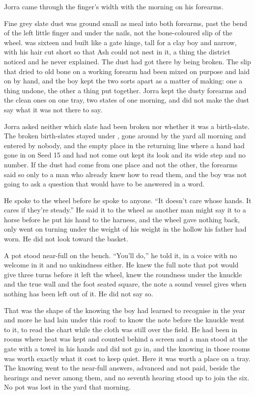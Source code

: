 Jorra came through the finger's width with the morning on his forearms.

Fine grey slate dust was ground small as meal into both forearms, past the bend of the left little finger and under the nails, not the bone-coloured slip of the wheel.  was sixteen and built like a gate hinge, tall for a clay boy and narrow, with his hair cut short so that Ash could not nest in it, a thing the district noticed and he never explained. The dust had got there by being broken. The slip that dried to old bone on a working forearm had been mixed on purpose and laid on by hand, and the boy kept the two sorts apart as a matter of making: one a thing undone, the other a thing put together. Jorra kept the dusty forearms and the clean ones on one tray, two states of one morning, and did not make the dust say what it was not there to say.

Jorra asked neither which slate had been broken nor whether it was a birth-slate. The broken birth-slates stayed under , gone around by the yard all morning and entered by nobody, and the empty place in the returning line where a hand had gone in on Seed 15 and had not come out kept its look and its wide step and no number. If the dust had come from one place and not the other, the forearms said so only to a man who already knew how to read them, and the boy was not going to ask a question that would have to be answered in a word.

He spoke to the wheel before he spoke to anyone. “It doesn’t care whose hands. It cares if they’re steady.” He said it to the wheel as another man might say it to a horse before he put his hand to the harness, and the wheel gave nothing back, only went on turning under the weight of his weight in the hollow his father had worn. He did not look toward the basket.

A pot stood near-full on the bench. “You’ll do,” he told it, in a voice with no welcome in it and no unkindness either. He knew the full note that pot would give three turns before it left the wheel, knew the roundness under the knuckle and the true wall and the foot seated square, the note a sound vessel gives when nothing has been left out of it. He did not say so.

That was the shape of the knowing the boy had learned to recognise in the year and more he had lain under this roof: to know the note before the knuckle went to it, to read the chart while the cloth was still over the field. He had been in rooms where heat was kept and counted behind a screen and a man stood at the gate with a towel in his hands and did not go in, and the knowing in those rooms was worth exactly what it cost to keep quiet. Here it was worth a place on a tray. The knowing went to the near-full answers, advanced and not paid, beside the hearings and never among them, and no seventh hearing stood up to join the six. No pot was lost in the yard that morning.

